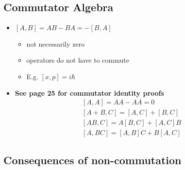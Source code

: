 \documentclass[a4paper,11pt,normalem]{article}
\begin{document}
\subsection{Commutator Algebra}\label{commutator-algebra}

\begin{itemize}
\item
  \([A, B] = AB - BA = -[B, A]\)
  \begin{itemize}
  \item
    not necessarily zero
  \item
    operators do not have to commute
  \item
    E.g. \([x, p] = i\hbar\)
  \end{itemize}
\item
  \textbf{See page 25 for commutator identity proofs} \[
  \begin{aligned}
  [A,A] = AA - AA = 0 \\
  [A + B, C] = [A, C] + [B, C] \\
  [AB, C] = A[B, C] + [A,C]B \\
  [A,BC] = [A,B]C + B[A,C]
  \end{aligned}
  \]
\end{itemize}

\subsection{Consequences of non-commutation}\label{consequences-of-non-commutation}
\end{document}
